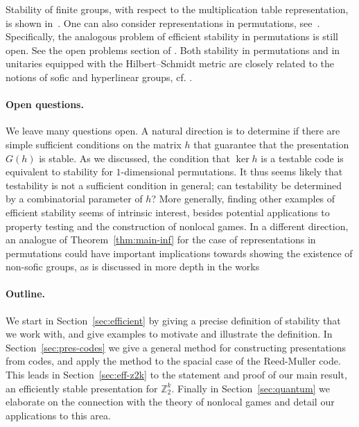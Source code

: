 \documentclass[11pt]{article}
\theoremstyle{definition}
\newcommand{\Z}{\ensuremath{\mathbb{Z}}}
\begin{document}
Stability of finite groups, with respect to the multiplication table representation, is shown in~\cite{gowers2017inverse}. 
One can also consider representations in permutations, see~\cite{glebsky2009almost,becker2022stability}.  Specifically, the analogous problem of efficient stability in permutations is still open. See the open problems section of \cite{CL_part2}. Both stability in permutations and in unitaries equipped with the Hilbert--Schmidt metric are closely related to the notions of sofic and hyperlinear groups, cf. \cite{glebsky2009almost,becker2020group}. 


\paragraph{Open questions.}
We leave many questions open. A natural direction is to determine if there are simple sufficient conditions on the matrix $h$ that guarantee that the presentation $G(h)$ is stable. As we discussed, the condition that $\ker h$ is a testable code is equivalent to stability for $1$-dimensional permutations. It thus seems likely that testability is not a sufficient condition in general; can testability be determined by a combinatorial parameter of $h$? More generally, finding other examples of efficient stability seems of intrinsic interest, besides potential applications to property testing and the construction of nonlocal games. In a different direction, an analogue of Theorem~\ref{thm:main-inf} for the case of representations in permutations could have important implications towards showing the existence of non-sofic groups, as is discussed in more depth in the works~\cite{CL_part2,BCLV_subgroup_tests}





\paragraph{Outline.}
We start in Section~\ref{sec:efficient} by giving a precise definition of stability that we work with, and give examples to motivate and illustrate the definition. In Section~\ref{sec:pres-codes} we give a general method for constructing presentations from codes, and apply the method to the spacial case of the Reed-Muller code. This leads in Section~\ref{sec:eff-z2k} to the statement and proof of our main result, an efficiently stable presentation for $\Z_2^k$. Finally in Section~\ref{sec:quantum} we elaborate on the connection with the theory of nonlocal games and detail our applications to this area. 
\end{document}
